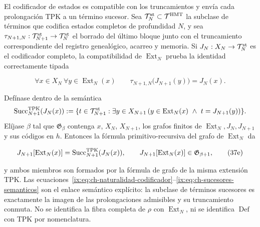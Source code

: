 El codificador de estados es compatible con los truncamientos y envía cada
prolongación TPK a un término sucesor. Sea
\(\mathcal T_N^{\rm st}\subset\mathcal T^{\rm HMT}\) la subclase de términos
que codifica estados completos de profundidad \(N\), y sea
\(\tau_{N+1,N}:\mathcal T_{N+1}^{\rm st}\to\mathcal T_N^{\rm st}\) el borrado
del último bloque junto con el truncamiento correspondiente del registro genealógico,
acarreo y memoria. Si \(J_N:X_N\to\mathcal T_N^{\rm st}\) es el codificador
completo, la compatibilidad de \(\operatorname{Ext}_N\) prueba la identidad
correctamente tipada

\[
 \forall x\in X_N\ \forall y\in\operatorname{Ext}_N(x)\qquad
 \tau_{N+1,N}\bigl(J_{N+1}(y)\bigr)=J_N(x).
\tag{37e$_0$}\label{ix:eq:ch-naturalidad-codificador}
\]

Defínase dentro de la semántica
\[
 \operatorname{Succ}^{\rm TPK}_{N+1}(J_N(x)):=
 \{t\in\mathcal T_{N+1}^{\rm st}:\exists y\in X_{N+1}\,
   (y\in\operatorname{Ext}_N(x)\ \wedge\ t=J_{N+1}(y))\}.
\]
Elíjase \(\beta\) tal que \(\mathfrak G_\beta\) contenga \(x\), \(X_N\),
\(X_{N+1}\), los grafos finitos de
\(\operatorname{Ext}_N,J_N,J_{N+1}\) y sus códigos en \(h\). Entonces la
fórmula primitivo-recursiva del grafo de \(\operatorname{Ext}_N\) da

\[
 J_{N+1}[\operatorname{Ext}_N(x)]
 =\operatorname{Succ}^{\rm TPK}_{N+1}(J_N(x)),
 \qquad
 J_{N+1}[\operatorname{Ext}_N(x)]
 \in\mathfrak G_{\beta+1},
\tag{37e}\label{ix:eq:ch-sucesores-semanticos}
\]

y ambos miembros son formados por la fórmula de grafo de la misma extensión
TPK. Las ecuaciones~\eqref{ix:eq:ch-naturalidad-codificador}--\eqref{ix:eq:ch-sucesores-semanticos} son el enlace semántico explícito: la
subclase de términos sucesores es exactamente la imagen de las prolongaciones
admisibles y su truncamiento conmuta. No se identifica la fibra completa de
\(\rho\) con \(\operatorname{Ext}_N\), ni se identifica
\(\operatorname{Def}\) con TPK por nomenclatura.

